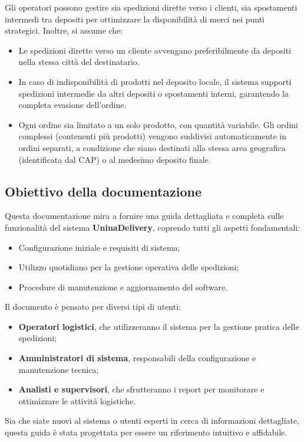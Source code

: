 Gli operatori possono gestire sia spedizioni dirette verso i clienti, sia spostamenti intermedi tra depositi per ottimizzare la disponibilità di merci nei punti strategici. Inoltre, si assume che:
\begin{itemize}[leftmargin=*,label={\textbullet},itemsep=0pt,topsep=0pt,partopsep=0pt]
  \item Le spedizioni dirette verso un cliente avvengano preferibilmente da depositi nella stessa città del destinatario.
  \item In caso di indisponibilità di prodotti nel deposito locale, il sistema supporti spedizioni intermedie da altri depositi o spostamenti interni, garantendo la completa evasione dell'ordine.
  \item Ogni ordine sia limitato a un solo prodotto, con quantità variabile. Gli ordini complessi (contenenti più prodotti) vengono suddivisi automaticamente in ordini separati, a condizione che siano destinati alla stessa area geografica (identificata dal CAP) o al medesimo deposito finale.
\end{itemize}

\subsection{Obiettivo della documentazione}

Questa documentazione mira a fornire una guida dettagliata e completa sulle funzionalità del sistema \textbf{UninaDelivery}, coprendo tutti gli aspetti fondamentali:
\begin{itemize}[leftmargin=*,label={\textbullet},itemsep=0pt,topsep=0pt,partopsep=0pt]
  \item Configurazione iniziale e requisiti di sistema;
  \item Utilizzo quotidiano per la gestione operativa delle spedizioni;
  \item Procedure di manutenzione e aggiornamento del software.
\end{itemize}

Il documento è pensato per diversi tipi di utenti:
\begin{itemize}[leftmargin=*,label={\textbullet},itemsep=0pt,topsep=0pt,partopsep=0pt]
  \item \textbf{Operatori logistici}, che utilizzeranno il sistema per la gestione pratica delle spedizioni;
  \item \textbf{Amministratori di sistema}, responsabili della configurazione e manutenzione tecnica;
  \item \textbf{Analisti e supervisori}, che sfrutteranno i report per monitorare e ottimizzare le attività logistiche.
\end{itemize}

Sia che siate nuovi al sistema o utenti esperti in cerca di informazioni dettagliate, questa guida è stata progettata per essere un riferimento intuitivo e affidabile.